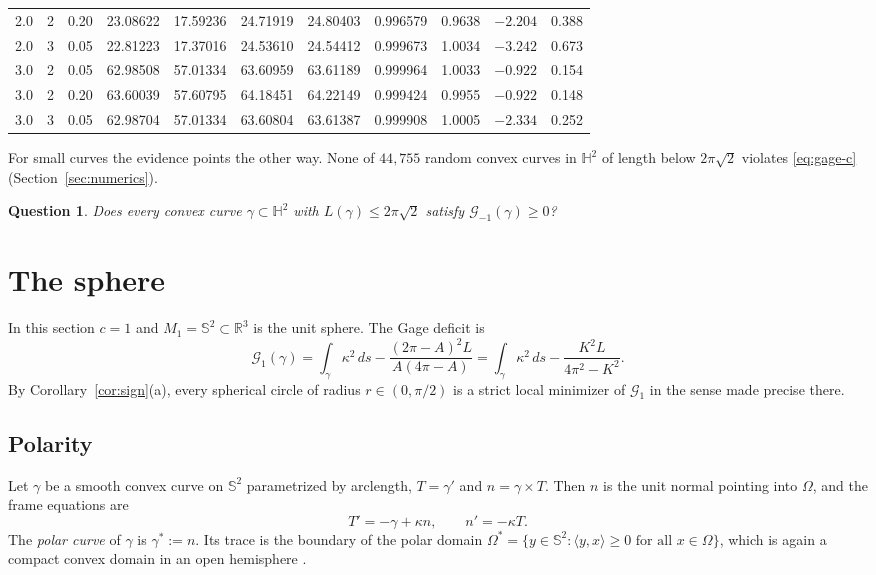 \documentclass[11pt]{amsart}
\newtheorem{question}[theorem]{Question}
\theoremstyle{definition}
\theoremstyle{remark}
\numberwithin{equation}{section}
\newcommand{\RR}{\mathbb{R}}
\newcommand{\HH}{\mathbb{H}}
\newcommand{\Sph}{\mathbb{S}}
\newcommand{\G}{\mathcal{G}}
\begin{document}
\begin{table}[t]
\begin{tabular}{cccrrrrcrrr}
2.0 & 2 & 0.20 & 23.08622 & 17.59236 & 24.71919 & 24.80403 & 0.996579 & 0.9638 & $-2.204$ & 0.388\\
2.0 & 3 & 0.05 & 22.81223 & 17.37016 & 24.53610 & 24.54412 & 0.999673 & 1.0034 & $-3.242$ & 0.673\\
3.0 & 2 & 0.05 & 62.98508 & 57.01334 & 63.60959 & 63.61189 & 0.999964 & 1.0033 & $-0.922$ & 0.154\\
3.0 & 2 & 0.20 & 63.60039 & 57.60795 & 64.18451 & 64.22149 & 0.999424 & 0.9955 & $-0.922$ & 0.148\\
3.0 & 3 & 0.05 & 62.98704 & 57.01334 & 63.60804 & 63.61387 & 0.999908 & 1.0005 & $-2.334$ & 0.252\\
\bottomrule
\end{tabular}
\end{table}

For small curves the evidence points the other way. None of $44{,}755$ random convex curves in $\HH^2$ of length below $2\pi\sqrt2$ violates \eqref{eq:gage-c} (Section~\ref{sec:numerics}).

\begin{question}\label{q:small}
Does every convex curve $\gamma\subset\HH^2$ with $L(\gamma)\le2\pi\sqrt2$ satisfy $\G_{-1}(\gamma)\ge0$?
\end{question}

\section{The sphere}\label{sec:sphere}

In this section $c=1$ and $M_1=\Sph^2\subset\RR^3$ is the unit sphere. The Gage deficit is
\[
\G_1(\gamma)=\int_\gamma\kappa^2\,ds-\frac{(2\pi-A)^2L}{A(4\pi-A)}=\int_\gamma\kappa^2\,ds-\frac{K^2L}{4\pi^2-K^2}.
\]
By Corollary~\ref{cor:sign}(a), every spherical circle of radius $r\in(0,\pi/2)$ is a strict local minimizer of $\G_1$ in the sense made precise there.

\subsection{Polarity}\label{sec:polar}
Let $\gamma$ be a smooth convex curve on $\Sph^2$ parametrized by arclength, $T=\gamma'$ and $n=\gamma\times T$. Then $n$ is the unit normal pointing into $\Omega$, and the frame equations are
\begin{equation}\label{eq:frame}
T'=-\gamma+\kappa n,\qquad n'=-\kappa T .
\end{equation}
The \emph{polar curve} of $\gamma$ is $\gamma^*:=n$. Its trace is the boundary of the polar domain $\Omega^*=\{y\in\Sph^2:\langle y,x\rangle\ge0\text{ for all }x\in\Omega\}$, which is again a compact convex domain in an open hemisphere \cite{Sa42}.
\end{document}
